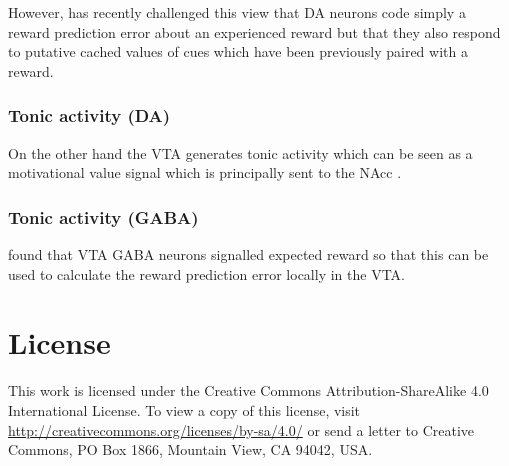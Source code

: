 \documentclass[12pt,a4paper]{article}
\begin{document}
However, \citet{Sadacca2016} has recently challenged this view that DA
neurons code simply a reward prediction error about an experienced
reward but that they also respond to putative cached values of cues
which have been previously paired with a reward.

\subsubsection{Tonic activity (DA)}
On the other hand the VTA generates tonic activity which can be seen
as a motivational value signal which is principally sent to the NAcc
\citep{Sesack2010, Bromberg-Martin2010} .

\subsubsection{Tonic activity (GABA)}
\citet{Cohen2012} found that VTA GABA neurons signalled expected reward so that this can be used to calculate the reward prediction error locally in the VTA.


\appendix



\section*{License}

This work is licensed under the Creative Commons
Attribution-ShareAlike 4.0 International License. To view a copy of
this license, visit
\url{http://creativecommons.org/licenses/by-sa/4.0/} or send a letter
to Creative Commons, PO Box 1866, Mountain View, CA 94042, USA.




\end{document}
